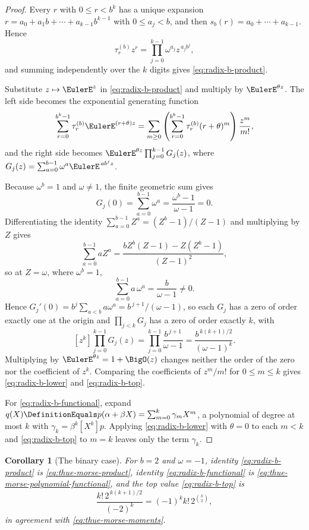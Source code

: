 \documentclass[11pt,a4paper,oneside,openany]{book}
\newtheorem{corollary}[corollary]{Corollary}
\theoremstyle{definition}
\theoremstyle{remark}
\begin{document}
\begin{proof}
Every $r$ with $0\le r<b^k$ has a unique expansion $r=a_0+a_1b+\cdots+a_{k-1}b^{k-1}$ with $0\le a_j<b$, and then $s_b(r)=a_0+\cdots+a_{k-1}$.  Hence
\[
 \tau^{(b)}_rz^r=\prod_{j=0}^{k-1}\omega^{a_j}z^{\,a_jb^j},
\]
and summing independently over the $k$ digits gives \eqref{eq:radix-b-product}.

Substitute $z\mapsto\EulerE^{z}$ in \eqref{eq:radix-b-product} and multiply by $\EulerE^{\theta z}$.  The left side becomes the exponential generating function
\[
 \sum_{r=0}^{b^k-1}\tau^{(b)}_r\EulerE^{(r+\theta)z}
 =\sum_{m\ge0}
   \left(\sum_{r=0}^{b^k-1}\tau^{(b)}_r(r+\theta)^m\right)\frac{z^m}{m!},
\]
and the right side becomes $\EulerE^{\theta z}\prod_{j=0}^{k-1}G_j(z)$, where
$G_j(z)=\sum_{a=0}^{b-1}\omega^a\EulerE^{\,ab^jz}$.

Because $\omega^b=1$ and $\omega\ne1$, the finite geometric sum gives
\[
 G_j(0)=\sum_{a=0}^{b-1}\omega^a=\frac{\omega^b-1}{\omega-1}=0 .
\]
Differentiating the identity $\sum_{a=0}^{b-1}Z^a=(Z^b-1)/(Z-1)$ and multiplying by $Z$ gives
\[
 \sum_{a=0}^{b-1}aZ^a
 =\frac{bZ^b(Z-1)-Z(Z^b-1)}{(Z-1)^2},
\]
so at $Z=\omega$, where $\omega^b=1$,
\begin{equation}\label{eq:omega-first-moment}
 \sum_{a=0}^{b-1}a\,\omega^a=\frac{b}{\omega-1}\ne0 .
\end{equation}
Hence $G_j'(0)=b^j\sum_{a<b}a\omega^a=b^{\,j+1}/(\omega-1)$, so each $G_j$ has a zero of order exactly one at the origin and $\prod_{j<k}G_j$ has a zero of order exactly $k$, with
\[
 [z^k]\prod_{j=0}^{k-1}G_j(z)
 =\prod_{j=0}^{k-1}\frac{b^{\,j+1}}{\omega-1}
 =\frac{b^{\,k(k+1)/2}}{(\omega-1)^k}.
\]
Multiplying by $\EulerE^{\theta z}=1+\BigO(z)$ changes neither the order of the zero nor the coefficient of $z^k$.  Comparing the coefficients of $z^m/m!$ for $0\le m\le k$ gives \eqref{eq:radix-b-lower} and \eqref{eq:radix-b-top}.

For \eqref{eq:radix-b-functional}, expand $q(X)\DefinitionEquals p(\alpha+\beta X)=\sum_{m=0}^{k}\gamma_mX^m$, a polynomial of degree at most $k$ with $\gamma_k=\beta^k[X^k]p$.  Applying \eqref{eq:radix-b-lower} with $\theta=0$ to each $m<k$ and \eqref{eq:radix-b-top} to $m=k$ leaves only the term $\gamma_k$.
\end{proof}

\begin{corollary}[The binary case]\label{cor:radix-two-recovers-thue-morse}
For $b=2$ and $\omega=-1$, identity \eqref{eq:radix-b-product} is \eqref{eq:thue-morse-product}, identity \eqref{eq:radix-b-functional} is \eqref{eq:thue-morse-polynomial-functional}, and the top value \eqref{eq:radix-b-top} is
\[
 \frac{k!\,2^{\,k(k+1)/2}}{(-2)^k}
 =(-1)^kk!\,2^{\binom k2},
\]
in agreement with \eqref{eq:thue-morse-moments}.
\end{corollary}
\end{document}
